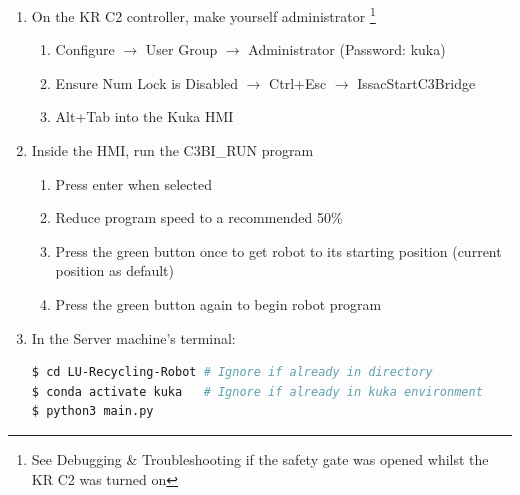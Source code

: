 \documentclass{ol-softwaremanual}
\begin{document}
\begin{enumerate}
\begin{lstlisting}[language=bash, caption="Checking and Restarting the DNS service on Server machine"]
# Restart the service
$ systemctl restart dnsmasq
    \end{lstlisting}
    \item On the KR C2 controller, make yourself administrator \footnote{See \hypertarget{Debugging \& Troubleshooting}{Debugging \& Troubleshooting} if the safety gate was opened whilst the KR C2 was turned on}
    \begin{enumerate}
        \item Configure $\rightarrow$ User Group $\rightarrow$ Administrator (Password: kuka)
        \item Ensure Num Lock is Disabled $\rightarrow$ Ctrl+Esc $\rightarrow$ IssacStartC3Bridge
        \item Alt+Tab into the Kuka HMI
    \end{enumerate}
    \item Inside the HMI, run the C3BI\_RUN program
    \begin{enumerate}
        \item Press enter when selected
        \item Reduce program speed to a recommended 50\%
        \item Press the green button once to get robot to its starting position (current position as default)
        \item Press the green button again to begin robot program
    \end{enumerate}
    \item In the Server machine's terminal:
    \begin{lstlisting}[language=bash, caption="Running Server code"]
$ cd LU-Recycling-Robot # Ignore if already in directory
$ conda activate kuka   # Ignore if already in kuka environment
$ python3 main.py
    \end{lstlisting}
\end{enumerate}
\end{document}
